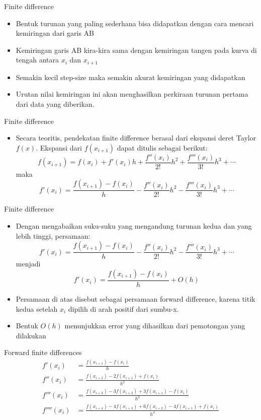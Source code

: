 \documentclass[pdflatex,compress,mathserif]{beamer}
\begin{document}
\begin{frame}{Finite difference}
    \begin{itemize}
        \item Bentuk turunan yang paling sederhana bisa didapatkan dengan cara mencari kemiringan dari garis AB
        \item Kemiringan garis AB kira-kira sama dengan kemiringan tangen pada kurva di tengah antara $x_i$ dan $x_{i+1}$
        \item Semakin kecil step-size maka semakin akurat kemiringan yang didapatkan
        \item Urutan nilai kemiringan ini akan menghasilkan perkiraan turunan pertama dari data yang diberikan.
    \end{itemize}
\end{frame}


\begin{frame}{Finite difference}
    \begin{itemize}
        \item Secara teoritis, pendekatan finite difference berasal dari ekspansi deret Taylor $f(x)$. Ekspansi dari $f(x_{i+1})$ dapat ditulis sebagai berikut:
        $$ f(x_{i+1}) = f(x_i) + f'(x_i)h + \frac{f''(x_i)}{2!}h^2 + \frac{f'''(x_i)}{3!}h^3 + \cdots $$ maka
        $$ f'(x_i) = \frac{f(x_{i+1}) - f(x_i)}{h} - \frac{f''(x_i)}{2!}h^2 - \frac{f'''(x_i)}{3!}h^3 + \cdots $$
    \end{itemize}
\end{frame}

\begin{frame}{Finite difference}
    \begin{itemize}
        \item Dengan mengabaikan suku-suku yang mengandung turunan kedua dan yang lebih tinggi, persamaan:
        $$ f'(x_i) = \frac{f(x_{i+1}) - f(x_i)}{h} - \frac{f''(x_i)}{2!}h^2 - \frac{f'''(x_i)}{3!}h^3 + \cdots $$
        menjadi
        $$ f'(x_i) = \frac{f(x_{i+1}) - f(x_i)}{h} + O(h) $$
        \item Persamaan di atas disebut sebagai persamaan forward difference, karena titik kedua setelah $x_i$ dipilih di arah positif dari sumbu-x.
        \item Bentuk $O(h)$ menunjukkan error yang dihasilkan dari pemotongan yang dilakukan
    \end{itemize}
\end{frame}

\begin{frame}{Forward finite differences}
    \begin{align*}
        f'(x_i) &= \frac{f(x_{i+1}) - f(x_i)}{h}\\
        f''(x_i) &= \frac{f(x_{i+2}) - 2f(x_{i+1}) + f(x_i)}{h^2}\\
        f'''(x_i) &= \frac{f(x_{i+3}) - 3f(x_{i+2}) + 3f(x_{i+1}) - f(x_i)}{h^3}\\
        f''''(x_i) &= \frac{f(x_{i+4}) - 4f(x_{i+3}) + 6f(x_{i+2}) - 4f(x_{i+1}) + f(x_i)}{h^4}\\
    \end{align*}
\end{frame}
\end{document}
